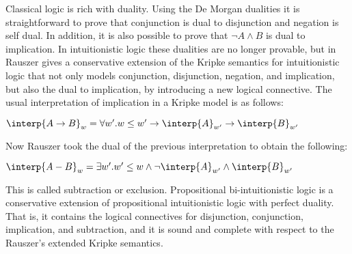 \newcommand{\redtoby}[1]{\stackrel{ \ifrName{({\tiny #1})}}{\redto}}



\newcommand{\ifrName}[1]{\textsc{#1}}

\newcommand{\ndto}[1]{\to_{#1}}
\newcommand{\ndwedge}[1]{\wedge_{#1}}

\newcommand{\To}[0]{\Rightarrow}
\newcommand{\SN}[0]{\mathbf{SN}} 

Classical logic is rich with duality.  Using the De Morgan dualities
it is straightforward to prove that conjunction is dual to disjunction
and negation is self dual.  In addition, it is also possible to prove
that $\lnot A \land B$ is dual to implication.  In intuitionistic
logic these dualities are no longer provable, but in
\cite{Rauszer:1974} Rauszer gives a conservative extension of the
Kripke semantics for intuitionistic logic that not only models
conjunction, disjunction, negation, and implication, but also the dual
to implication, by introducing a new logical connective. The usual
interpretation of implication in a Kripke model is as follows:
\begin{center}
  \begin{math}
    \interp{A \to B}_w = \forall w'.w \leq w' \to \interp{A}_{w'} \to \interp{B}_{w'}
  \end{math}
\end{center}
Now Rauszer took the dual of the previous interpretation to obtain the following:
\begin{center}
  \begin{math}
    \interp{A - B}_w = \exists w'.w' \leq w \land \lnot\interp{A}_{w'} \land \interp{B}_{w'}
  \end{math}
\end{center}
This is called subtraction or exclusion.  Propositional
bi-intuitionistic logic is a conservative extension of propositional
intuitionistic logic with perfect duality.  That is, it contains the
logical connectives for disjunction, conjunction, implication, and
subtraction, and it is sound and complete with respect to the
Rauszer's extended Kripke semantics.

